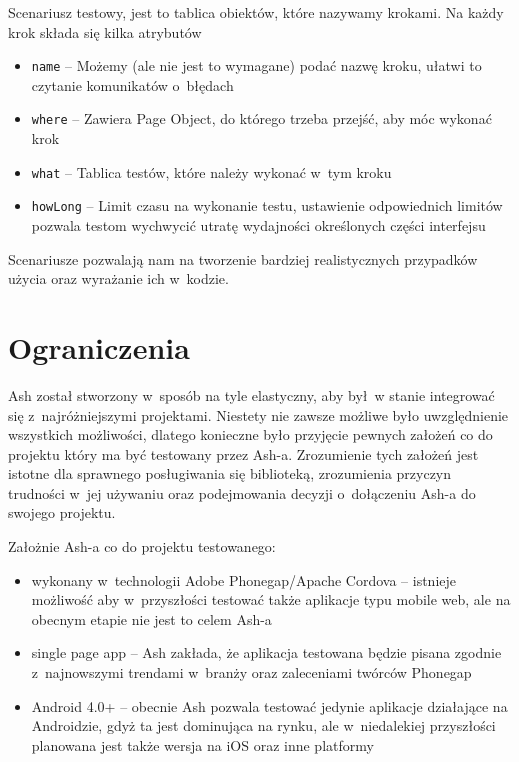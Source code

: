 \documentclass[brudnopis]{xmgr}
\begin{document}
Scenariusz testowy, jest to tablica obiektów, które nazywamy krokami. Na każdy krok składa się kilka atrybutów

  \begin{itemize}
    \item \texttt{name} -- Możemy (ale nie jest to wymagane) podać nazwę kroku, ułatwi to czytanie komunikatów o~błędach
    \item \texttt{where} -- Zawiera Page Object, do którego trzeba przejść, aby móc wykonać krok 
    \item \texttt{what} -- Tablica testów, które należy wykonać w~tym kroku
    \item \texttt{howLong} -- Limit czasu na wykonanie testu, ustawienie odpowiednich limitów pozwala testom wychwycić utratę wydajności określonych części interfejsu
  \end{itemize}

Scenariusze pozwalają nam na tworzenie bardziej realistycznych przypadków użycia oraz wyrażanie ich w~kodzie. 

\section{Ograniczenia}

Ash został stworzony w~sposób na tyle elastyczny, aby był~w stanie integrować się z~najróżniejszymi projektami. Niestety nie zawsze możliwe było uwzględnienie wszystkich możliwości, dlatego konieczne było przyjęcie pewnych założeń co do projektu który ma być testowany przez Ash-a. Zrozumienie tych założeń jest istotne dla sprawnego posługiwania się biblioteką, zrozumienia przyczyn trudności w~jej używaniu oraz podejmowania decyzji o~dołączeniu Ash-a do swojego projektu.

Założnie Ash-a co do projektu testowanego:

\begin{itemize}
  \item wykonany w~technologii Adobe Phonegap/Apache Cordova -- istnieje możliwość aby w~przyszłości testować także aplikacje typu mobile web, ale na obecnym etapie nie jest to celem Ash-a
  \item single page app -- Ash zakłada, że aplikacja testowana będzie pisana zgodnie z~najnowszymi trendami w~branży oraz zaleceniami twórców Phonegap
  \item Android 4.0+ -- obecnie Ash pozwala testować jedynie aplikacje działające na Androidzie, gdyż ta jest dominująca na rynku, ale w~niedalekiej przyszłości planowana jest także wersja na iOS oraz inne platformy
\end{itemize}
\end{document}
